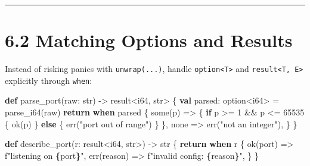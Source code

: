 \documentclass[
  english,
  oneside]{book}
\newenvironment{Shaded}{\begin{snugshade}}{\end{snugshade}}
\newcommand{\ConstantTok}[1]{\textcolor[rgb]{0.31,0.76,1.00}{#1}}
\newcommand{\ControlFlowTok}[1]{\textcolor[rgb]{0.77,0.53,0.75}{\textbf{#1}}}
\newcommand{\DataTypeTok}[1]{\textcolor[rgb]{0.31,0.79,0.69}{#1}}
\newcommand{\DecValTok}[1]{\textcolor[rgb]{0.71,0.81,0.66}{#1}}
\newcommand{\FunctionTok}[1]{\textcolor[rgb]{0.86,0.86,0.67}{#1}}
\newcommand{\KeywordTok}[1]{\textcolor[rgb]{0.34,0.61,0.84}{\textbf{#1}}}
\newcommand{\NormalTok}[1]{\textcolor[rgb]{0.83,0.83,0.83}{#1}}
\newcommand{\OperatorTok}[1]{\textcolor[rgb]{0.83,0.83,0.83}{#1}}
\newcommand{\StringTok}[1]{\textcolor[rgb]{0.81,0.57,0.47}{#1}}
\newcounter{none} %
\begin{document}
\begin{center}\rule{0.5\linewidth}{0.5pt}\end{center}

\section{6.2 Matching Options and
Results}\label{matching-options-and-results}

Instead of risking panics with \texttt{unwrap(...)}, handle
\texttt{option\textless{}T\textgreater{}} and
\texttt{result\textless{}T,\ E\textgreater{}} explicitly through
\texttt{when}:

\begin{Shaded}
\begin{Highlighting}[]
\KeywordTok{def}\NormalTok{ parse\_port(raw: }\DataTypeTok{str}\NormalTok{) }\OperatorTok{{-}\textgreater{}} \DataTypeTok{result}\OperatorTok{\textless{}}\DataTypeTok{i64}\NormalTok{, }\DataTypeTok{str}\OperatorTok{\textgreater{}}\NormalTok{ \{}
    \KeywordTok{val}\NormalTok{ parsed: }\DataTypeTok{option}\OperatorTok{\textless{}}\DataTypeTok{i64}\OperatorTok{\textgreater{}} \OperatorTok{=} \FunctionTok{parse\_i64}\NormalTok{(raw)}
    \ControlFlowTok{return} \ControlFlowTok{when}\NormalTok{ parsed \{}
        \FunctionTok{some}\NormalTok{(p) }\OperatorTok{=\textgreater{}}\NormalTok{ \{}
            \ControlFlowTok{if}\NormalTok{ p }\OperatorTok{\textgreater{}=} \DecValTok{1} \OperatorTok{\&\&}\NormalTok{ p }\OperatorTok{\textless{}=} \DecValTok{65535}\NormalTok{ \{}
                \FunctionTok{ok}\NormalTok{(p)}
\NormalTok{            \} }\ControlFlowTok{else}\NormalTok{ \{}
                \FunctionTok{err}\NormalTok{(}\StringTok{"port out of range"}\NormalTok{)}
\NormalTok{            \}}
\NormalTok{        \},}
        \ConstantTok{none} \OperatorTok{=\textgreater{}} \FunctionTok{err}\NormalTok{(}\StringTok{"not an integer"}\NormalTok{),}
\NormalTok{    \}}
\NormalTok{\}}

\KeywordTok{def}\NormalTok{ describe\_port(r: }\DataTypeTok{result}\OperatorTok{\textless{}}\DataTypeTok{i64}\NormalTok{, }\DataTypeTok{str}\OperatorTok{\textgreater{}}\NormalTok{) }\OperatorTok{{-}\textgreater{}} \DataTypeTok{str}\NormalTok{ \{}
    \ControlFlowTok{return} \ControlFlowTok{when}\NormalTok{ r \{}
        \FunctionTok{ok}\NormalTok{(port) }\OperatorTok{=\textgreater{}} \StringTok{f"listening on }\ControlFlowTok{\{}\NormalTok{port}\ControlFlowTok{\}}\StringTok{"}\NormalTok{,}
        \FunctionTok{err}\NormalTok{(reason) }\OperatorTok{=\textgreater{}} \StringTok{f"invalid config: }\ControlFlowTok{\{}\NormalTok{reason}\ControlFlowTok{\}}\StringTok{"}\NormalTok{,}
\NormalTok{    \}}
\NormalTok{\}}


\end{Highlighting}
\end{Shaded}
\end{document}
